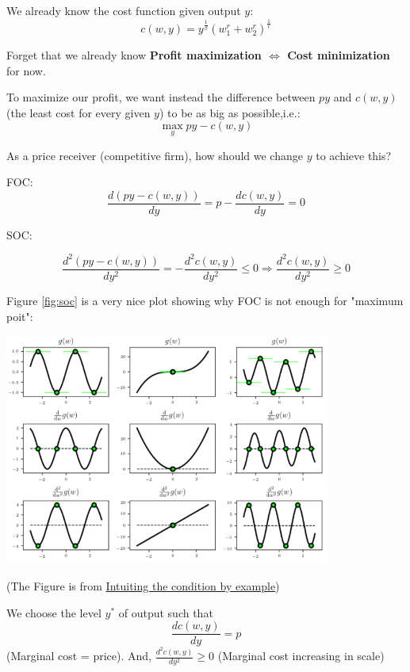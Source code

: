 \documentclass{article}
\begin{document}
\begin{mdframed}[backgroundcolor=blue!20,linecolor=white]

We already know the cost function given output $y$:
$$c(w,y) = y^{\frac{1}{\beta}}{(w_1^r + w_2^r)^{\frac{1}{r}}} $$

Forget that we already know \textbf{Profit maximization $\iff$  Cost minimization} for now.

To maximize our profit, we want instead the difference between $py$ and $c(w,y)$(the least cost for every given $y$) to be as big as possible,i.e.:
$$\max_{y} py - c(w,y)$$

As a price receiver (competitive firm), how should we change $y$ to achieve this?

FOC:
$$\frac{d(py - c(w,y))}{dy} = p - \frac{dc(w,y)}{dy}=0$$

SOC:

$$\frac{d^2(py - c(w,y))}{dy^2} = - \frac{d^2c(w,y)}{dy^2} \le 0 \Rightarrow \frac{d^2c(w,y)}{dy^2} \ge 0$$

Figure \ref{fig:soc} is a very nice plot showing why FOC is not enough for "maximum poit":

\vspace{2mm}
{\centering
\includegraphics[width=0.8\textwidth]{5.soc}
\label{fig:soc}}
\vspace{2mm}

(The Figure is from \href{https://kenndanielso.github.io/mlrefined/blog_posts/7_Second_order_methods/7_8_Second_order_condition.html}{Intuiting the condition by example})


We choose the level $y^*$ of output such that 
$$\frac{dc(w,y)}{dy}= p$$
(Marginal cost = price). And,
$\frac{d^2c(w,y)}{dy^2} \ge 0$
(Marginal cost increasing in scale)


\end{mdframed}
\end{document}
